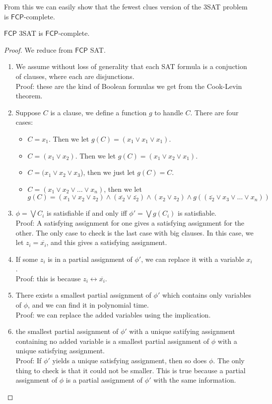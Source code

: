 \documentclass[runningheads,a4paper]{llncs}
\begin{document}
From this we can easily show that the fewest clues version of the 3SAT problem is $\mathsf{FCP}$-complete.

\begin{theorem}
\label{thm:3sat}
$\mathsf{FCP}$ 3SAT is $\mathsf{FCP}$-complete.
\end{theorem}

\begin{proof}
We reduce from $\mathsf{FCP}$ SAT. 
\begin{enumerate}
\item We assume without loss of generality that each SAT formula is a conjuction of clauses, where each are disjunctions.\\
Proof: these are the kind of Boolean formulas we get from the Cook-Levin theorem.
\item Suppose $C$ is a clause, we define a function $g$ to handle $C$. There are four cases:
\begin{itemize}
\item $C = x_1$. Then we let $g(C) = (x_1 \vee x_1 \vee x_1)$.
\item $C = (x_1 \vee x_2)$. Then we let $g(C) = (x_1 \vee x_2 \vee x_1)$.
\item $C = (x_1 \vee x_2 \vee x_3$), then we just let $g(C) = C$. 
\item $C = (x_1 \vee x_2 \vee \dots \vee x_n)$, then we let
\[ g(C) = (x_1 \vee x_2 \vee z_2) \wedge (\overline{x_2} \vee \overline{z_2}) \wedge (x_2 \vee z_2) \wedge g((\overline{z_2} \vee x_3 \vee \dots \vee x_n)) \]
\end{itemize}
\item $\phi = \bigvee C_i$ is satisfiable if and only iff $\phi' = \bigvee g(C_i)$ is satisfiable.\\
Proof: A satisfying assignment for one gives a satisfying assignment for the other. The only case to check is the last case with big clauses. In this case, we let $z_i = \overline{x_i}$, and this gives a satisfying assignment.
\item If some $z_i$ is in a partial assignment of $\phi'$, we can replace it with a variable $x_i$. \\
Proof: this is because $z_i \leftrightarrow \overline{x_i}$. 
\item There exists a smallest partial assignment of $\phi'$ which contains only variables of $\phi$, and we can find it in polynomial time. \\
Proof: we can replace the added variables using the implication.
\item the smallest partial assignment of $\phi'$ with a unique satifying assignment containing no added variable is a smallest partial assignment of $\phi$ with a unique satisfying assignment. \\
Proof: If $\phi'$ yields a unique satisfying assignment, then so does $\phi$. The only thing to check is that it could not be smaller. This is true because a partial assignment of $\phi$ is a partial assignment of $\phi'$ with the same information. 
\end{enumerate}
\end{proof}
\end{document}

